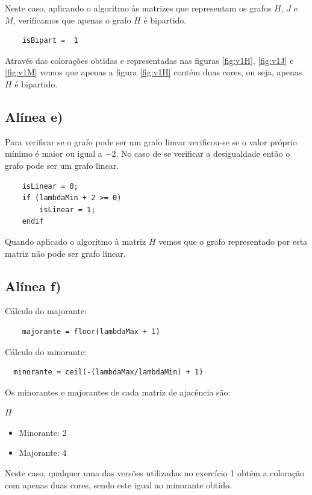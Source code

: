 \documentclass[a4paper,12pt]{report}
\begin{document}
Neste caso, aplicando o algoritmo às matrizes que representam os grafos $H$, $J$ e $M$, verificamos que apenas o grafo $H$ é bipartido. 

\begin{lstlisting}
    isBipart =  1
\end{lstlisting}

Através das colorações obtidas e representadas nas figuras \ref{fig:v1H}, \ref{fig:v1J} e \ref{fig:v1M} vemos que apenas a figura \ref{fig:v1H} contém duas cores, ou seja, apenas $H$ é bipartido.

\subsection*{Alínea e)}

Para verificar se o grafo pode ser um grafo linear verificou-se se o valor próprio mínimo é maior ou igual a $-2$. No caso de se verificar a desigualdade então o grafo pode ser um grafo linear.

\begin{lstlisting}
    isLinear = 0;
    if (lambdaMin + 2 >= 0)
        isLinear = 1;
    endif
\end{lstlisting}

Quando aplicado o algoritmo à matriz $H$ vemos que o grafo representado por esta matriz não pode ser grafo linear.

\subsection*{Alínea f)}

Cálculo do majorante:

\begin{lstlisting}
    majorante = floor(lambdaMax + 1)
\end{lstlisting}

Cálculo do minorante:

\begin{lstlisting}
  minorante = ceil(-(lambdaMax/lambdaMin) + 1)
\end{lstlisting}

Os minorantes e majorantes de cada matriz de ajacência são:

$H$
\begin{itemize}
    \item Minorante: 2
    \item Majorante: 4
\end{itemize}

Neste caso, qualquer uma das versões utilizadas no exercício 1 obtém a coloração com apenas duas cores, sendo este igual ao minorante obtido.
\end{document}
